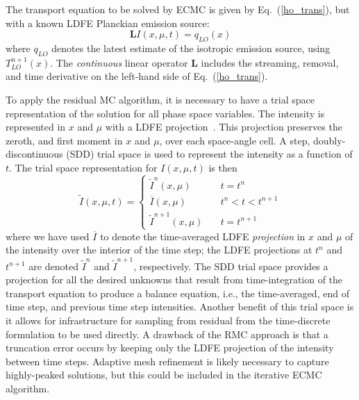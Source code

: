 \documentclass{anstrans}
\renewcommand{\eqref}[1]{(\ref{#1})}
\newcommand{\B}[1]{\ensuremath{\mathbf{#1}}}
\begin{document}
The transport equation to be solved by ECMC is given by Eq.~\eqref{ho_trans}, but with a
known LDFE Planckian emission source:
\begin{equation}\label{te_oper}
    \B L I(x,\mu,t)  = q_{LO}(x)
\end{equation}
where $q_{LO}$ denotes the latest estimate of the isotropic emission source, using $T_{LO}^{n+1}(x)$.  The \emph{continuous} linear operator $\B L$ includes the streaming, removal, and
time derivative on the left-hand side of Eq.~\eqref{ho_trans}.  

To apply the residual MC algorithm, it is necessary to have a trial space representation
of the solution for all phase space variables.  The intensity is represented in $x$ and $\mu$ with a
LDFE projection~\cite{bolding_nse}.  This projection preserves the zeroth, and
first moment in $x$ and $\mu$, over each space-angle cell.  A step, doubly-discontinuous (SDD) trial
space is used to represent the intensity as a function of $t$.  The trial space
representation for $I(x,\mu,t)$ is then
\begin{equation}\label{eq:time_space}
    \tilde I(x,\mu,t) = \left \{ \begin{array}{cl}
        \tilde I^{n}(x,\mu)  & \quad t = t^n \\ 
        \overline I(x,\mu)  & \quad t^{n} < t <t^{n+1} \\               
      \tilde I^{n+1}(x,\mu)   &  \quad        t = t^{n+1}
    \end{array}           \right.
\end{equation}
where we have used $\overline I$ to denote the time-averaged LDFE \emph{projection} in $x$
and $\mu$ of the intensity over the interior of the time step;  the LDFE projections at
$t^{n}$ and $t^{n+1}$ are denoted $\tilde I^{n}$ and $\tilde I^{n+1}$, respectively.    
 The SDD trial space provides a
projection for all the desired unknowns that result from time-integration of the transport
equation to produce a balance equation, i.e., the time-averaged, end of time step, and
previous time step intensities. Another benefit of this
trial space is it allows for infrastructure for sampling from residual from the
time-discrete formulation to be used directly. A drawback of the RMC approach is that
a truncation error occurs by keeping only the LDFE projection of the intensity between
time steps.  Adaptive mesh refinement is likely necessary to capture highly-peaked solutions, but
this could be included in the iterative ECMC algorithm.
\end{document}
